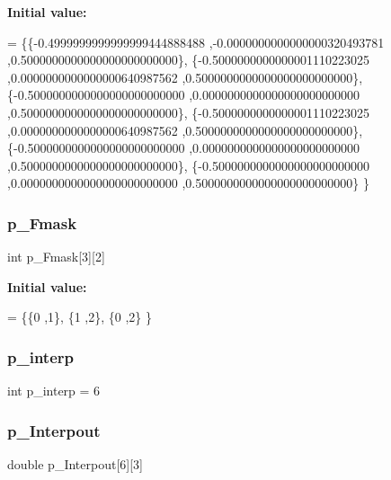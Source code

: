 {\bfseries Initial value\+:}
\begin{DoxyCode}
= \{\{-0.4999999999999999444888488 ,-0.0000000000000000320493781 ,0.5000000000000000000000000\},
\{-0.5000000000000001110223025 ,0.0000000000000000640987562 ,0.5000000000000000000000000\},
\{-0.5000000000000000000000000 ,0.0000000000000000000000000 ,0.5000000000000000000000000\},
\{-0.5000000000000001110223025 ,0.0000000000000000640987562 ,0.5000000000000000000000000\},
\{-0.5000000000000000000000000 ,0.0000000000000000000000000 ,0.5000000000000000000000000\},
\{-0.5000000000000000000000000 ,0.0000000000000000000000000 ,0.5000000000000000000000000\}
\}
\end{DoxyCode}
\mbox{\label{a00446_a19c5c57b7dc71eb0fbdc015125cce46a}} 
\subsubsection{\texorpdfstring{p\+\_\+\+Fmask}{p\_Fmask}}
{\footnotesize\ttfamily int p\+\_\+\+Fmask\mbox{[}3\mbox{]}\mbox{[}2\mbox{]}}

{\bfseries Initial value\+:}
\begin{DoxyCode}
= \{\{0 ,1\},
\{1 ,2\},
\{0 ,2\}
\}
\end{DoxyCode}
\mbox{\label{a00446_a240743866e0fdfc2ade414eedd98fde2}} 
\subsubsection{\texorpdfstring{p\+\_\+interp}{p\_interp}}
{\footnotesize\ttfamily int p\+\_\+interp = 6}

\mbox{\label{a00446_af62f12b714a2ff2e1818599ff3209595}} 
\subsubsection{\texorpdfstring{p\+\_\+\+Interpout}{p\_Interpout}}
{\footnotesize\ttfamily double p\+\_\+\+Interpout\mbox{[}6\mbox{]}\mbox{[}3\mbox{]}}

